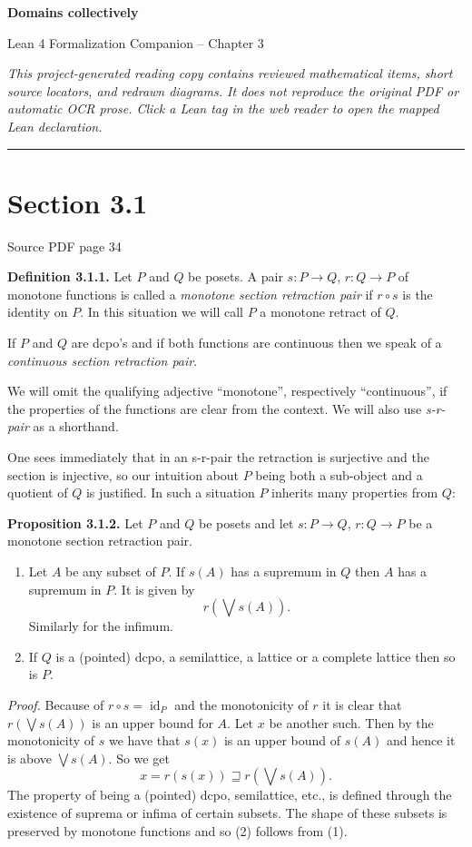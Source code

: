 \documentclass[11pt]{article}
\newcommand{\leanmarker}[2]{%
  \Needspace{3\baselineskip}%
  \marginnote{\hyperlink{#1}{\color{LeanTeal}\fbox{\scriptsize Lean}}}%
  \hypertarget{#1}{\textbf{#2.}}%
}
\newcommand{\sourcepage}[1]{\par\medskip\noindent\textcolor{SourceGray}{\scriptsize Source PDF page #1}\par\smallskip}
\begin{document}
\begin{center}\LARGE\bfseries Domains collectively\par\medskip
\large Lean 4 Formalization Companion -- Chapter 3\end{center}
\medskip
\noindent\textit{This project-generated reading copy contains reviewed mathematical items, short source locators, and redrawn diagrams. It does not reproduce the original PDF or automatic OCR prose. Click a Lean tag in the web reader to open the mapped Lean declaration.}
\bigskip\hrule\bigskip
\section*{Section 3.1}
\sourcepage{34}
\leanmarker{def-3-1-1}{Definition 3.1.1} Let $P$ and $Q$ be posets. A pair $s:P\to Q$, $r:Q\to P$ of monotone functions is called a \emph{monotone section retraction pair} if $r\circ s$ is the identity on $P$. In this situation we will call $P$ a monotone retract of $Q$.

If $P$ and $Q$ are dcpo's and if both functions are continuous then we speak of a \emph{continuous section retraction pair}.

We will omit the qualifying adjective ``monotone'', respectively ``continuous'', if the properties of the functions are clear from the context. We will also use \emph{s-r-pair} as a shorthand.

One sees immediately that in an s-r-pair the retraction is surjective and the section is injective, so our intuition about $P$ being both a sub-object and a quotient of $Q$ is justified. In such a situation $P$ inherits many properties from $Q$:

\leanmarker{prop-3-1-2}{Proposition 3.1.2} Let $P$ and $Q$ be posets and let $s:P\to Q$, $r:Q\to P$ be a monotone section retraction pair.
\begin{enumerate}
\item Let $A$ be any subset of $P$. If $s(A)$ has a supremum in $Q$ then $A$ has a supremum in $P$. It is given by
\[
  r\left(\bigvee s(A)\right).
\]
Similarly for the infimum.
\item If $Q$ is a (pointed) dcpo, a semilattice, a lattice or a complete lattice then so is $P$.
\end{enumerate}

\emph{Proof.} Because of $r\circ s=\operatorname{id}_P$ and the monotonicity of $r$ it is clear that $r(\bigvee s(A))$ is an upper bound for $A$. Let $x$ be another such. Then by the monotonicity of $s$ we have that $s(x)$ is an upper bound of $s(A)$ and hence it is above $\bigvee s(A)$. So we get
\[
  x = r(s(x)) \sqsupseteq r\left(\bigvee s(A)\right).
\]
The property of being a (pointed) dcpo, semilattice, etc., is defined through the existence of suprema or infima of certain subsets. The shape of these subsets is preserved by monotone functions and so (2) follows from (1).
\end{document}
